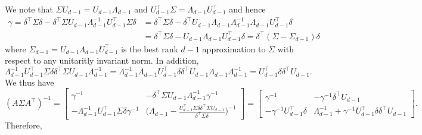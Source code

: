 \documentclass[10pt]{article}
\begin{document}
We note that $\Sigma U_{d-1} = U_{d-1} \Lambda_{d-1}$ and $U_{d-1}^{\top} \Sigma = \Lambda_{d-1} U_{d-1}^{\top}$ and hence
\begin{equation*}
\begin{split}
 \gamma = \delta^{\top} \Sigma \delta - \delta^{\top} \Sigma U_{d-1} \Lambda_{d-1}^{-1} U_{d-1}^{\top} \Sigma \delta &= \delta^{\top} \Sigma \delta - \delta^{\top} U_{d-1} \Lambda_{d-1} \Lambda_{d-1}^{-1} \Lambda_{d-1} U_{d-1}^{\top} \delta \\ & =  \delta^{\top} \Sigma \delta - U_{d-1} \Lambda_{d-1} U_{d-1}^{\top} \delta = \delta^{\top} (\Sigma - \Sigma_{d-1}) \delta
 \end{split}
 \end{equation*}
 where $\Sigma_{d-1} = U_{d-1} \Lambda_{d-1} U_{d-1}^{\top}$ is the best rank $d-1$ approximation to $\Sigma$ with respect to any unitaritly invariant norm. In addition,
 $$ \Lambda_{d-1}^{-1} U_{d-1}^{\top} \Sigma \delta \delta^{\top} \Sigma U_{d-1} \Lambda_{d-1}^{-1} = \Lambda_{d-1}^{-1} \Lambda_{d-1} U_{d-1}^{\top} \delta \delta^{\top} U_{d-1} \Lambda_{d-1} \Lambda_{d-1}^{-1} = U_{d-1}^{\top} \delta \delta^{\top} U_{d-1}.$$
 We thus have
 \begin{equation*}
 (A \Sigma A^{\top})^{-1} = \begin{bmatrix} \gamma^{-1} & - \delta^{\top} \Sigma U_{d-1} \Lambda_{d-1}^{-1} \gamma^{-1} \\
- \Lambda_{d-1}^{-1} U_{d-1}^{\top} \Sigma \delta \gamma^{-1} & \bigl(\Lambda_{d-1} - \frac{U_{d-1}^{\top} \Sigma \delta \delta^{\top} \Sigma U_{d-1}}{\delta^{\top} \Sigma \delta} \bigr)^{-1} \end{bmatrix} = \begin{bmatrix} \gamma^{-1} & - \gamma^{-1} \delta^{\top} U_{d-1} \\ - \gamma^{-1} U_{d-1}^{\top} \delta & \Lambda_{d-1}^{-1} + \gamma^{-1}  U_{d-1}^{\top} \delta \delta^{\top} U_{d-1} \end{bmatrix}.
 \end{equation*}
 Therefore,
\end{document}
